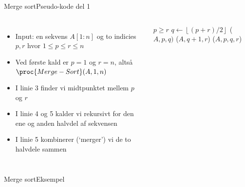 \documentclass[aspectratio=1610]{beamer}
\newcommand{\floor}[1]{\left\lfloor #1 \right\rfloor}
\begin{document}
\begin{frame}{Merge sort}{Pseudo-kode del 1}
    \begin{columns}

        \begin{itemize}[<+->]
            \small
            \item Input: en sekvens $A[1:n]$ og to \alert{indicies} $p, r$ hvor
                $1 \leq p \leq r \leq n$
            \item Ved første kald er $p=1$ og $r=n$, altså
                $\proc{Merge-Sort}(A,1,n)$
            \item I linie 3 finder vi midtpunktet mellem $p$ og $r$
            \item I linie 4 og 5 kalder vi rekursivt for den ene og anden
                halvdel af sekvensen
            \item I linie 5 kombinerer (`merger') vi de to halvdele sammen
        \end{itemize}


        \begin{minipage}{\textwidth}
            \centering
            \begin{tcolorbox}

                \vspace{-\abovedisplayskip}
                \begin{codebox}
                    \li \If $p \geq r$ \Then
                        \li \Return
                    \End
                    \li $q \gets \floor{(p+r)/2}$
                    \li {}($A,p,q)$
                    \li {}($A,q+1,r$)
                    \li {}($A,p,q,r$)
                \end{codebox}
            \end{tcolorbox}
        \end{minipage}
        
    \end{columns}
\end{frame}

\begin{frame}{Merge sort}{Eksempel}
    
\end{frame}
\end{document}
